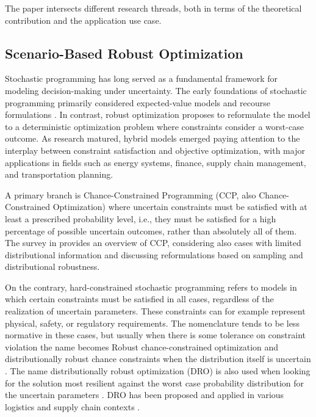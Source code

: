 \documentclass[ijoc,sglanonrev]{informs4}
\begin{document}
The paper intersects different research threads, both in terms of the theoretical contribution and the application use case.

\subsection{Scenario-Based Robust Optimization}

Stochastic programming has long served as a fundamental framework for modeling decision-making under uncertainty. The early foundations of stochastic programming primarily considered expected-value models and recourse formulations \cite{B55,D55}. In contrast, robust optimization \cite{BN98,BS04} proposes to reformulate the model to a deterministic optimization problem where constraints consider a worst-case outcome. As research matured, hybrid models emerged paying attention to the interplay between constraint satisfaction and objective optimization, with major applications in fields such as energy systems, finance, supply chain management, and transportation planning.

A primary branch is Chance-Constrained Programming (CCP, also Chance-Constrained Optimization) \cite{CC59,P95} where uncertain constraints must be satisfied with at least a prescribed probability level, i.e., they must be satisfied for a high percentage of possible uncertain outcomes, rather than absolutely all of them. The survey in \cite{KJ22} provides an overview of CCP, considering also cases with limited distributional information and discussing reformulations based on sampling and distributional robustness.

On the contrary, hard-constrained stochastic programming \cite{BL11,SDR09} refers to models in which certain constraints must be satisfied in all cases, regardless of the realization of uncertain parameters. These constraints can for example represent physical, safety, or regulatory requirements. The nomenclature tends to be less normative in these cases, but usually when there is some tolerance on constraint violation the name becomes Robust chance-constrained optimization \cite{RM22} and distributionally robust chance constraints when the distribution itself is uncertain \cite{DY10,RM22}. The name distributionally robust optimization (DRO) is also used when looking for the solution most resilient against the worst case probability distribution for the uncertain parameters \cite{DY10}. DRO has been proposed and applied in various logistics and supply chain contexts \cite{WC20,JWCZ22}.
\end{document}
